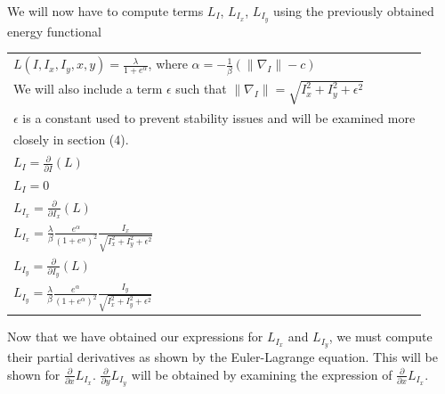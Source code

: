 \documentclass{article}
\begin{document}
    \noindent
    We will now have to compute terms $L_{I}$, $L_{I_{x}}$, $L_{I_{y}}$ using the previously obtained energy functional
      \begin{center}
        \begin{tabular}{l}
          $L(I,I_{x},I_{y},x,y) = \frac{\lambda}{1+e^{\alpha}}$, where $\alpha = -\frac{1}{\beta}(\| \nabla_{I} \|-c)$\\
          We will also include a term $\epsilon$ such that $\| \nabla_{I} \| = \sqrt{I_{x}^2 + I_{y}^2 + \epsilon^2}$\\
          $\epsilon$ is a constant used to prevent stability issues and will be examined more\\
          \vspace{12pt}
          closely in section (4).\\
          $L_{I} = \frac{\partial}{\partial I}(L)$\\
          $L_{I} = 0$\\
          $L_{I_{x}} = \frac{\partial}{\partial I_{x}}(L)$\\
          $L_{I_{x}} = \frac{\lambda}{\beta} \frac{e^\alpha}{(1+e^{\alpha})^2} \frac{I_{x}}{\sqrt{I_{x}^2 + I_{y}^2 + \epsilon^2}}$\\
          $L_{I_{y}} = \frac{\partial}{\partial I_{y}}(L)$\\
          $L_{I_{y}} = \frac{\lambda}{\beta} \frac{e^\alpha}{(1+e^{\alpha})^2} \frac{I_{y}}{\sqrt{I_{x}^2 + I_{y}^2 + \epsilon^2}}$\\
        \end{tabular}
      \end{center}
      \vspace{12pt}

    \noindent
    Now that we have obtained our expressions for $L_{I_{x}}$ and $L_{I_{y}}$, we must compute their partial derivatives
    as shown by the Euler-Lagrange equation. This will be shown for $\frac{\partial}{\partial x}L_{I_{x}}$. $\frac{\partial}{\partial y}L_{I_{y}}$ will be obtained by examining
    the expression of $\frac{\partial}{\partial x}L_{I_{x}}$.\\
\end{document}
